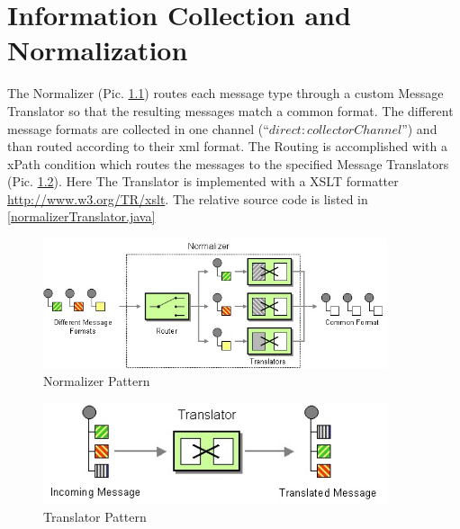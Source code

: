 \documentclass[11pt,english,ngerman, headsepline]{scrreprt}
\begin{document}
\chapter{Information Collection and Normalization}\label{chapter:normalization}

The Normalizer \cite{hohpe2003enterprise} (Pic. \ref{normalizerPic}) routes each
message type through a custom Message Translator so that the resulting messages match a common format. 
The different message formats are collected in one channel
(``$direct:collectorChannel$'') and than routed according to their xml format.
The Routing is accomplished with a xPath condition which routes the messages to
the specified Message Translators \cite{hohpe2003enterprise} (Pic.
\ref{translatorPic}). Here The Translator is implemented with a XSLT formatter
\url{http://www.w3.org/TR/xslt}.
The relative source code is listed in \ref{normalizerTranslator.java}


  \begin{figure}[h!]
	\begin{center}
	\includegraphics[width=0.9\textwidth]{pics/NormalizerDetail.jpg}
	\end{center}
	\caption{Normalizer Pattern \cite{hohpe2003enterprise}}
	\label{normalizerPic} 
   \end{figure}
   
   
   \begin{figure}[h!]
	\begin{center}
	\includegraphics[width=0.9\textwidth]{pics/MessageTranslator.jpg}
	\end{center}
	\caption{Translator Pattern \cite{hohpe2003enterprise}}
	\label{translatorPic} 
   \end{figure}
\end{document}
